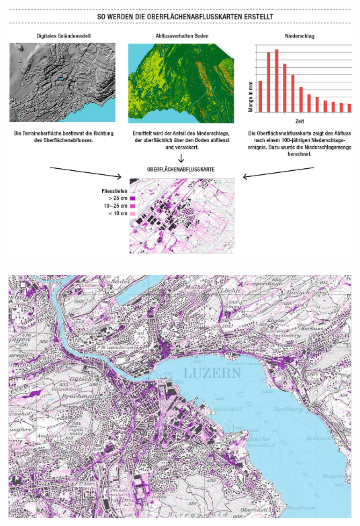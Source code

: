 \documentclass[xcolor=dvipsnames, USenglish]{beamer}  %
\begin{document}
\begin{frame}
\begin{figure}
      \begin{subfigure}[b]{0.25\textwidth}
        \includegraphics[width=\textwidth]{img/overlandflow_map1.jpg}
        \label{subfig:ovflowmap1}
      \end{subfigure}
      \quad
      \begin{subfigure}[b]{0.25\textwidth}
        \includegraphics[width=\textwidth]{img/overlandflow_map2.jpg}
        \label{subfig:ovflowmap2}
      \end{subfigure}
    \end{figure}
  \end{frame}

\end{document}
